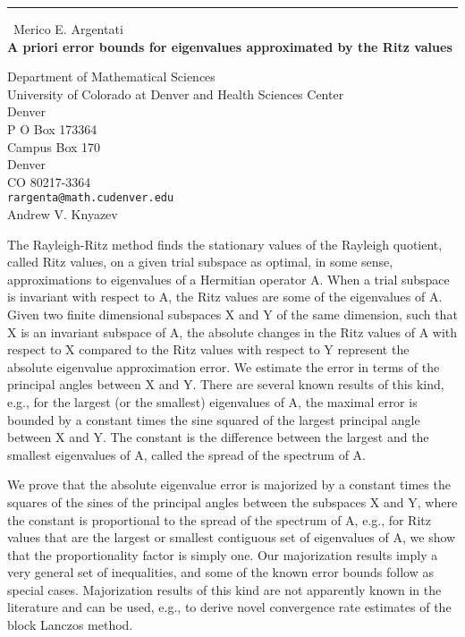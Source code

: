 \documentclass{report}
\begin{document}
\begin{center}
\rule{6in}{1pt} \
{\large Merico E. Argentati \\
{\bf A priori error bounds for eigenvalues approximated by the Ritz values}}

Department of Mathematical Sciences \\ University of Colorado at Denver and Health Sciences Center \\ Denver \\ P O Box 173364 \\ Campus Box 170 \\ Denver \\ CO 80217-3364
\\
{\tt rargenta@math.cudenver.edu}\\
Andrew V. Knyazev\end{center}

The Rayleigh-Ritz method finds the stationary values of the Rayleigh
quotient, called Ritz values, on a given trial subspace as optimal, in
some sense, approximations to eigenvalues of a Hermitian operator A. When
a trial subspace is invariant with respect to A, the Ritz values are some
of the eigenvalues of A. Given two finite dimensional subspaces X and Y
of the same dimension, such that X is an invariant subspace of A, the
absolute changes in the Ritz values of A with respect to X compared to
the Ritz values with respect to Y represent the absolute eigenvalue
approximation error. We estimate the error in terms of the principal
angles between X and Y. There are several known results of this kind,
e.g., for the largest (or the smallest) eigenvalues of A, the maximal
error is bounded by a constant times the sine squared of the largest
principal angle between X and Y. The constant is the difference between
the largest and the smallest eigenvalues of A, called the spread of the
spectrum of A.

We prove that the absolute eigenvalue error is majorized by a constant
times the squares of the sines of the principal angles between the
subspaces X and Y, where the constant is proportional to the spread of
the spectrum of A, e.g., for
Ritz values that are the largest or smallest contiguous set of
eigenvalues of A, we show that the proportionality factor is simply one.
Our majorization results imply a very general set of inequalities, and
some of the known error bounds follow as special cases. Majorization
results of this kind are not apparently known in the literature and can
be used, e.g., to derive novel convergence rate estimates of the block
Lanczos method.
\end{document}
